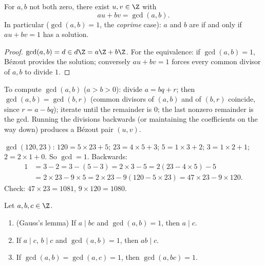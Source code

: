 \begin{corollary}\label{cor:b1:arith:bezout}
For $a, b$ not both zero, there exist $u, v \in \Z$ with
\[
au + bv = \gcd(a, b) .
\]
In particular ($\gcd(a,b) = 1$, the \emph{coprime}
case): $a$ and $b$ are  if and only if $au + bv = 1$ has a
solution.
\end{corollary}

\begin{proof}
$\gcd(a,b) = d \in d\Z = a\Z + b\Z$. For the equivalence: if
$\gcd(a,b) = 1$, Bézout provides the solution; conversely $au + bv =
1$ forces every common divisor of $a, b$ to divide $1$.
\end{proof}

\begin{method}\label{met:b1:arith:euclid}
To compute $\gcd(a, b)$ ($a > b > 0$): divide $a = bq + r$; then
$\gcd(a, b) = \gcd(b, r)$ (common divisors of $(a,b)$ and of $(b,r)$
coincide, since $r = a - bq$); iterate until the remainder is $0$; the
last nonzero remainder is the gcd. Running
the divisions backwards (or maintaining the coefficients on the way
down) produces a Bézout pair $(u, v)$.
\end{method}

\begin{example}\label{ex:b1:arith:euclid}
$\gcd(120, 23)$: $120 = 5 \times 23 + 5$; $23 = 4 \times 5 + 3$; $5 =
1\times 3 + 2$; $3 = 1 \times 2 + 1$; $2 = 2 \times 1 + 0$. So
$\gcd = 1$. Backwards:
\begin{align*}
1 &= 3 - 2 = 3 - (5 - 3) = 2\times 3 - 5 = 2(23 - 4\times 5) - 5 \\
&= 2 \times 23 - 9 \times 5 = 2\times 23 - 9(120 - 5\times 23)
= 47 \times 23 - 9 \times 120 .
\end{align*}
Check: $47 \times 23 = 1081$, $9 \times 120 = 1080$.
\end{example}

\begin{theorem}\label{thm:b1:arith:gauss}
Let $a, b, c \in \Z$.
\begin{enumerate}
  \item (Gauss's lemma) If $a \mid bc$ and
        $\gcd(a, b) = 1$, then $a \mid c$.
  \item If $a \mid c$, $b \mid c$ and $\gcd(a,b) = 1$, then $ab \mid
        c$.
  \item If $\gcd(a, b) = \gcd(a, c) = 1$, then $\gcd(a, bc) = 1$.
\end{enumerate}
\end{theorem}

